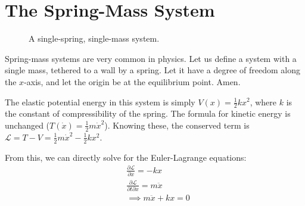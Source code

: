 \documentclass[%
 preprint,
 amsmath,amssymb,
 aps,
 pra,
 fleqn,
]{revtex4-2}
\begin{document}
\section{The Spring-Mass System} %

\begin{figure}
    \centering
    \caption{A single-spring, single-mass system.}
\end{figure}

Spring-mass systems are very common in physics.  Let us define a system with a single mass, tethered to a wall by a spring.  Let it have a degree of freedom along the $x$-axis, and let the origin be at the equilibrium point.  Amen.

The elastic potential energy in this system is simply $\displaystyle V(x) = \frac12kx^2$, where $k$ is the constant of compressibility of the spring.  The formula for kinetic energy is unchanged ($\displaystyle T(\dot x) = \frac12m\dot x^2$).  Knowing these, the conserved term is $\displaystyle \mathscr L = T - V = \frac12m\dot x^2 - \frac12kx^2$.

From this, we can directly solve for the Euler-Lagrange equations:
\begin{align*}
  &\frac{∂\mathscr L}{∂x} = -kx\\
  &\frac{∂\mathscr L}{∂t∂x} = m\ddot x\\
  &⟹ m\ddot x + kx = 0\\
\end{align*}
\end{document}
